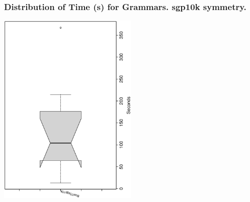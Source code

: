  \begin{frame}
 \frametitle{ Distribution of Time (s) for Grammars. sgp10k  symmetry. }
 \begin{center}
\includegraphics[width=0.5\textwidth, angle=-90]
{ExpFboxplottSeconds008.eps}
 \end{center}
 \label{ExpFboxplottSeconds008.eps}  
 \end{frame}

